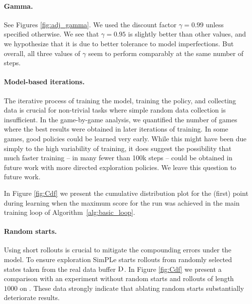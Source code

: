 \paragraph{Gamma.} See Figures \ref{fig:adj_gamma}. We used the discount factor $\gamma=0.99$ unless specified otherwise.  We see that $\gamma=0.95$ is slightly better than other values, and we hypothesize that it is due to better tolerance to model imperfections. But overall, all three values of $\gamma$ seem to perform comparably at the same number of steps.

\paragraph{Model-based iterations.}
The iterative process of training the model, training the policy, and collecting data is crucial for non-trivial tasks where simple random data collection is insufficient. In the game-by-game analysis, we quantified the number of games where the best results were obtained in later iterations of training. In some games, good policies could be learned very early. While this might have been due simply to the high variability of training, it does suggest the possibility that much faster training -- in many fewer than 100k steps -- could be obtained in future work with more directed exploration policies. We leave this question to future work.

In Figure \ref{fig:Cdf} we present the cumulative distribution plot for the (first) point during learning when the maximum score for the run was achieved in the main training loop of Algorithm~\ref{alg:basic_loop}.

\paragraph{Random starts.} Using short rollouts is crucial to mitigate the compounding errors under the model. To ensure exploration SimPLe starts rollouts from randomly selected states taken from the real data buffer $\textsc{D}$. In Figure \ref{fig:Cdf} we present a comparison with an experiment without random starts and rollouts of length $1000$ on \seaquest. These data strongly indicate that ablating random starts substantially deteriorate results.  

